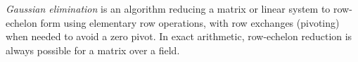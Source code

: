 
\emph{Gaussian elimination} is an algorithm reducing a matrix or linear system to row-echelon form using elementary row operations, with row exchanges (pivoting) when needed to avoid a zero pivot. In exact arithmetic, row-echelon reduction is always possible for a matrix over a field.
